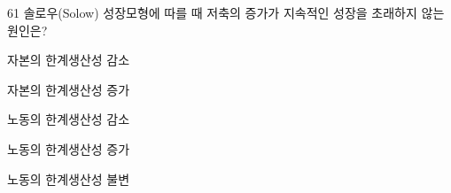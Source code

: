 \begin{question}{61}
솔로우(Solow) 성장모형에 따를 때 저축의 증가가 지속적인 성장을 초래하지 않는 원인은?
\begin{choices}
  \item 자본의 한계생산성 감소
  \item 자본의 한계생산성 증가
  \item 노동의 한계생산성 감소
  \item 노동의 한계생산성 증가
  \item 노동의 한계생산성 불변
\end{choices}
\end{question}
